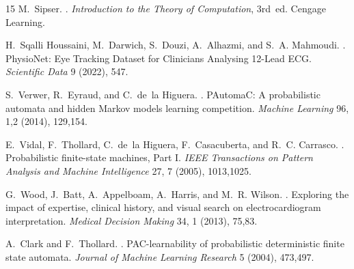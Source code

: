 \documentclass[sigconf]{acmart}
\theoremstyle{plain}
\theoremstyle{definition}
\begin{document}
\begin{thebibliography}{15}
M.~Sipser.
.
\newblock \emph{Introduction to the Theory of Computation}, 3rd~ed.
\newblock Cengage Learning.

H.~Sqalli Houssaini, M.~Darwich, S.~Douzi, A.~Alhazmi, and S.~A. Mahmoudi.
.
\newblock PhysioNet: Eye Tracking Dataset for Clinicians Analysing 12-Lead ECG.
\newblock \emph{Scientific Data} 9 (2022), 547.

S.~Verwer, R.~Eyraud, and C.~de~la Higuera.
.
\newblock PAutomaC: A probabilistic automata and hidden Markov models learning competition.
\newblock \emph{Machine Learning} 96, 1,2 (2014), 129,154.

E.~Vidal, F.~Thollard, C.~de~la Higuera, F.~Casacuberta, and R.~C. Carrasco.
.
\newblock Probabilistic finite-state machines, Part I.
\newblock \emph{IEEE Transactions on Pattern Analysis and Machine Intelligence} 27, 7 (2005), 1013,1025.

G.~Wood, J.~Batt, A.~Appelboam, A.~Harris, and M.~R. Wilson.
.
\newblock Exploring the impact of expertise, clinical history, and visual search on electrocardiogram interpretation.
\newblock \emph{Medical Decision Making} 34, 1 (2013), 75,83.

A.~Clark and F.~Thollard.
.
\newblock PAC-learnability of probabilistic deterministic finite state automata.
\newblock \emph{Journal of Machine Learning Research} 5 (2004), 473,497.

\end{thebibliography}
\end{document}
